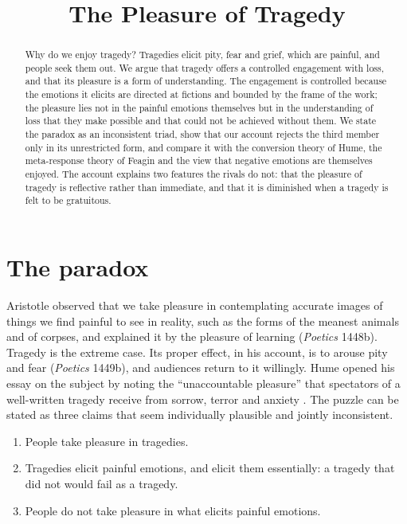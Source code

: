\documentclass{situationist-preprint}
\title{The Pleasure of Tragedy}
\begin{document}
\maketitle

\begin{abstract}
Why do we enjoy tragedy? Tragedies elicit pity, fear and grief, which are painful, and people seek them out. We argue that tragedy offers a controlled engagement with loss, and that its pleasure is a form of understanding. The engagement is controlled because the emotions it elicits are directed at fictions and bounded by the frame of the work; the pleasure lies not in the painful emotions themselves but in the understanding of loss that they make possible and that could not be achieved without them. We state the paradox as an inconsistent triad, show that our account rejects the third member only in its unrestricted form, and compare it with the conversion theory of Hume, the meta-response theory of Feagin and the view that negative emotions are themselves enjoyed. The account explains two features the rivals do not: that the pleasure of tragedy is reflective rather than immediate, and that it is diminished when a tragedy is felt to be gratuitous.
\end{abstract}

\section{The paradox}

Aristotle observed that we take pleasure in contemplating accurate images of things we find painful to see in reality, such as the forms of the meanest animals and of corpses, and explained it by the pleasure of learning (\emph{Poetics} 1448b). Tragedy is the extreme case. Its proper effect, in his account, is to arouse pity and fear (\emph{Poetics} 1449b), and audiences return to it willingly. Hume opened his essay on the subject by noting the \enquote{unaccountable pleasure} that spectators of a well-written tragedy receive from sorrow, terror and anxiety \citep{Hume1757}. The puzzle can be stated as three claims that seem individually plausible and jointly inconsistent.

\begin{enumerate}[label=(T\arabic*),nosep]
\item People take pleasure in tragedies.
\item Tragedies elicit painful emotions, and elicit them essentially: a tragedy that did not would fail as a tragedy.
\item People do not take pleasure in what elicits painful emotions.
\end{enumerate}
\end{document}
